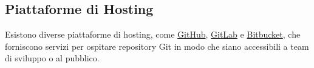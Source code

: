 \subsection{Piattaforme di Hosting}
Esistono diverse piattaforme di hosting, come \href{https://github.com/}{GitHub}, \href{https://about.gitlab.com/}{GitLab} e \href{https://bitbucket.org/product}{Bitbucket}, che forniscono servizi per ospitare repository Git in modo che siano accessibili a team di sviluppo o al pubblico.

